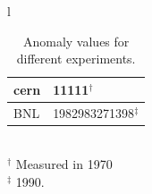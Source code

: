 \documentclass{outhesis}
\begin{document}
\begin{table}
  \caption{Anomaly values for different experiments.}
  \label{tab:exp}
  \centering
  \begin{tabular}{l}
    \begin{tabular*}{0.6\textwidth}{l @{\extracolsep{\fill}} l} \hline \hline
      cern  & 11111$^{\dagger}$ \\ \hline
          BNL         & 1982983271398$^{\ddagger}$ \\
           \hline
    \end{tabular*} \\
    $^{\dagger}$ Measured in 1970\\
    $^{\ddagger}$ 1990. \\
  \end{tabular}
\end{table}






 \appendix
 



\end{document}
